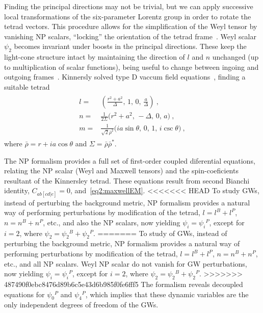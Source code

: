 Finding the principal directions may not be trivial, but we can apply successive local transformations of the six-parameter Lorentz group in order to rotate the tetrad vectors. 
This procedure allows for the simplification of the Weyl tensor by vanishing NP scalars, ``locking'' the orientation of the tetrad frame~\cite{Chandrasekhar1998}.
Weyl scalar $\psi_2$ becomes invariant under boosts in the principal directions.
These keep the light-cone structure intact by maintaining the direction of $l$ and $n$ unchanged (up to multiplication of scalar functions), being useful to change between ingoing and outgoing frames~\cite{Teukolsky1974}. 
Kinnersly solved type D vaccum field equations~\cite{Kinnersley1969}, finding a suitable tetrad 
\begin{align}
    \begin{split}
        l =& \left(\frac{r^2+a^2}{\Delta}, \, 1, \,0, \,\frac{a}{\Delta} \right) ~, \\
        n =& \frac{1}{2 \Sigma} \Bigr( r^2+a^2, \,-\Delta, \,0 , \,a \Bigr) ~, \\
        m =& \frac{1}{ \sqrt{2} \bar{\rho}^2 } \Bigr( i a \sin\theta, \,0, \,1, \, i \csc\theta \Bigr) ~,
    \end{split}
\end{align}
where $\bar{\rho} = r + i a \cos\theta$ and $\Sigma = \bar{\rho} \bar{\rho}^*$.

The NP formalism provides a full set of first-order coupled diferential equations, relating the NP scalar (Weyl and Maxwell tensors) and the spin-coeficients resultant of the Kinnersley tetrad. These equations result from second Bianchi identity, $C_{ab[cd \rvert e ]} = 0$, and~\eqref{eq2:maxwellEM}.
<<<<<<< HEAD
To study GWs, instead of perturbing the background metric, NP formalism provides a natural way of performing perturbations by modification of the tetrad, $l=l^B+l^P$, $n=n^B+n^P$, etc., and also the NP scalars, now yielding $\psi_i = \psi_i{}^P$, except for $i=2$, where $\psi_2 = \psi_2{}^B+\psi_2{}^P$.
=======
To study of GWs, instead of perturbing the background metric, NP formalism provides a natural way of performing perturbations by modification of the tetrad, $l=l^B+l^P$, $n=n^B+n^P$, etc., and all NP scalars.
Weyl NP scalar do not vanish for GW perturbations, now yielding $\psi_i = \psi_i{}^P$, except for $i=2$, where $\psi_2 = \psi_2{}^B+\psi_2{}^P$.
>>>>>>> 487490f0ebc8476d89b6c5e43d6b985f0fe6fff5
The formalism reveals decoupled equations for $\psi_0{}^P$ and $\psi_4{}^P$, which implies that these dynamic variables are the only independent degrees of freedom of the GWs.

